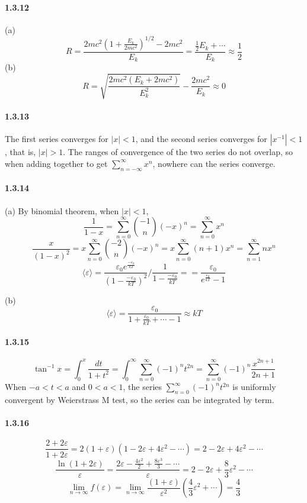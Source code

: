 \documentclass[a4paper]{article}
\begin{document}
\paragraph{1.3.12}
(a) 
\[R=\frac{2mc^2(1+\frac{E_k}{2mc^2})^{1/2}-2mc^2}{E_k}=\frac{\frac{1}{2}E_k+\cdots}{E_k}\approx \frac{1}{2}\]
(b)
\[R=\sqrt{\frac{2mc^2(E_k+2mc^2)}{E_k^2}}-\frac{2mc^2}{E_k}\approx0\]

\paragraph{1.3.13}
The first series converges for $|x|<1$, and the second series converges for $|x^{-1}|<1$, that is, $|x|>1$. The ranges of convergence of the two series do not overlap, so when adding together to get $\sum_{n=-\infty}^\infty x^n$, nowhere can the series converge.

\paragraph{1.3.14}
(a) By binomial theorem, when $|x|<1$, \[\frac{1}{1-x}=\sum_{n=0}^\infty\binom{-1}{n}(-x)^n=\sum_{n=0}^\infty x^n\]
\[\frac{x}{(1-x)^2}=x\sum_{n=0}^\infty\binom{-2}{n}(-x)^n=x\sum_{n=0}^\infty(n+1)x^n=\sum_{n=1}^\infty nx^n\]
\[\langle \varepsilon \rangle=\frac{\varepsilon_0 e^{\frac{-\varepsilon_0}{kT}}}{(1-\frac{-\varepsilon_0}{kT})^2}\Big/ \frac{1}{1-\frac{-\varepsilon_0}{kT}}==\frac{\varepsilon_0}{e^{\frac{\varepsilon_0}{kT}}-1}\]

(b) 
\[\langle \varepsilon \rangle=\frac{\varepsilon_0}{1+\frac{\varepsilon_0}{kT}+\cdots-1}\approx kT\]

\paragraph{1.3.15}
\[\tan^{-1}x=\int_{0}^x\frac{dt}{1+t^2}=\int_0^\infty\sum_{n=0}^\infty(-1)^n t^{2n}=\sum_{n=0}^\infty(-1)^n\frac{x^{2n+1}}{2n+1}\]
When $-a<t<a$ and $0<a<1$, the series $\sum_{n=0}^\infty (-1)^n t^{2n}$ is uniformly convergent by Weierstrass M test, so the series can be integrated by term. 

\paragraph{1.3.16}
\[\frac{2+2\varepsilon}{1+2\varepsilon}=2(1+\varepsilon)(1-2\varepsilon+4\varepsilon^2-\cdots)=2-2\varepsilon+4\varepsilon^2-\cdots\]
\[\frac{\ln(1+2\varepsilon)}{\varepsilon}=\frac{2\varepsilon-\frac{4\varepsilon^2}{2}+\frac{8\varepsilon^3}{3}-\cdots}{\varepsilon}=2-2\varepsilon+\frac{8}{3}\varepsilon^2-\cdots\]
\[\lim_{n\to\infty}f(\varepsilon)=\lim_{n\to\infty}\frac{(1+\varepsilon)}{\varepsilon^2}\left(\frac{4}{3}\varepsilon^2+\cdots\right)=\frac{4}{3}\]
\end{document}
